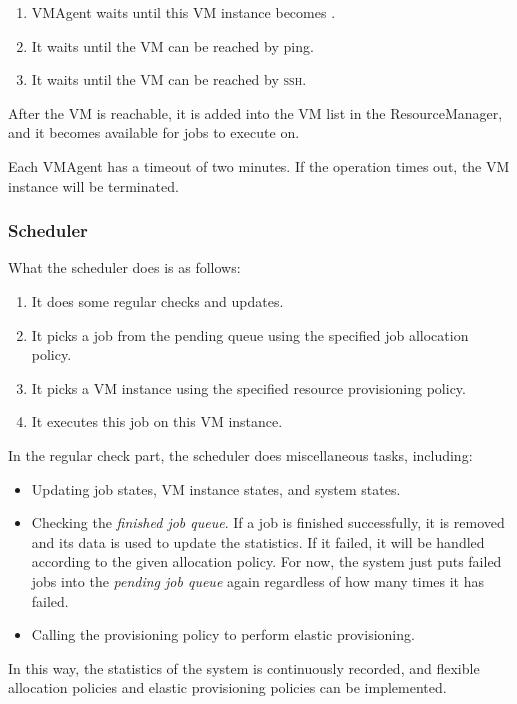 \begin{enumerate}
\item VMAgent waits until this VM instance becomes \staterunning.
\item It waits until the VM can be reached by ping.
\item It waits until the VM can be reached by \textsc{ssh}.
\end{enumerate}

After the VM is reachable, it is added into the VM list in the
ResourceManager, and it becomes available for jobs to execute on.

Each VMAgent has a timeout of two minutes. If the operation times out,
the VM instance will be terminated.

\subsubsection{Scheduler}
What the scheduler does is as follows:

\begin{enumerate}
\item It does some regular checks and updates.
\item It picks a job from the pending queue using the specified job
  allocation policy.
\item It picks a VM instance using the specified resource provisioning
  policy.
\item It executes this job on this VM instance.
\end{enumerate}

In the regular check part, the scheduler does miscellaneous tasks,
including:
\begin{itemize}
\item Updating job states, VM instance states, and system states.
\item Checking the \emph{finished job queue}. If a job is finished
  successfully, it is removed and its data is used to update the
  statistics. If it failed, it will be handled according to the given
  allocation policy. For now, the system just puts failed jobs into
  the \emph{pending job queue} again regardless of how many times it
  has failed.
\item Calling the provisioning policy to perform elastic provisioning.
\end{itemize}

In this way, the statistics of the system is continuously recorded,
and flexible allocation policies and elastic provisioning policies can
be implemented.


